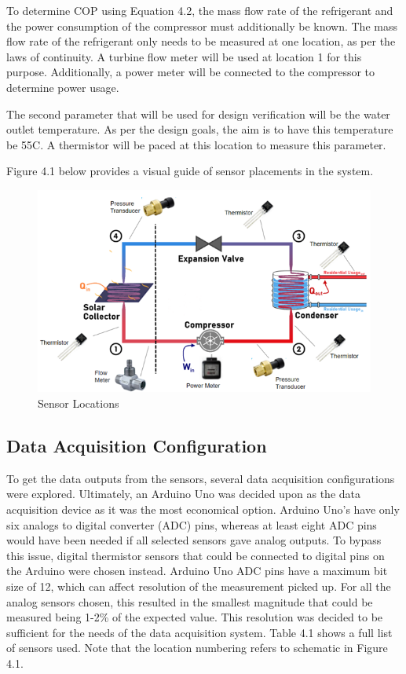 \medskip
To determine COP using Equation 4.2, the mass flow rate of the refrigerant and the power consumption of the compressor must additionally be known. The mass flow rate of the refrigerant only needs to be measured at one location, as per the laws of continuity. A turbine flow meter will be used at location 1 for this purpose. Additionally, a power meter will be connected to the compressor to determine power usage.

\medskip
The second parameter that will be used for design verification will be the water outlet temperature. As per the design goals, the aim is to have this temperature be 55\textdegree C. A thermistor will be paced at this location to measure this parameter.

\medskip
Figure 4.1 below provides a visual guide of sensor placements in the system.

\medskip
\begin{figure}[H]
    \centering
    \includegraphics[width=\textwidth]{images/sensor_locations.png}
    \caption{Sensor Locations}
\end{figure}

\subsection{Data Acquisition Configuration}

To get the data outputs from the sensors, several data acquisition configurations were explored. Ultimately, an Arduino Uno was decided upon as the data acquisition device as it was the most economical option. Arduino Uno’s have only six analogs to digital converter (ADC) pins, whereas at least eight ADC pins would have been needed if all selected sensors gave analog outputs. To bypass this issue, digital thermistor sensors that could be connected to digital pins on the Arduino were chosen instead. Arduino Uno ADC pins have a maximum bit size of 12, which can affect resolution of the measurement picked up. For all the analog sensors chosen, this resulted in the smallest magnitude that could be measured being 1-2\% of the expected value. This resolution was decided to be sufficient for the needs of the data acquisition system. Table 4.1 shows a full list of sensors used. Note that the location numbering refers to schematic in Figure 4.1.

